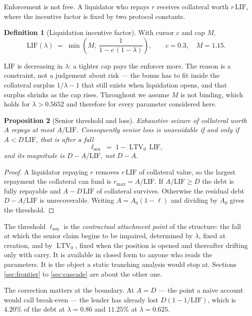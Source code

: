 \documentclass[11pt,a4paper]{article}
\theoremstyle{plain}
\newtheorem{proposition}{Proposition}
\theoremstyle{definition}
\newtheorem{definition}[proposition]{Definition}
\theoremstyle{remark}
\newcommand{\LIF}{\mathrm{LIF}}
\DeclareMathOperator{\ltv}{LTV}
\begin{document}
Enforcement is not free. A liquidator who repays $r$ receives collateral worth $r\,\LIF$, where
the incentive factor is fixed by two protocol constants.

\begin{definition}[Liquidation incentive factor]
With cursor $c$ and cap $M$,
\[
  \LIF(\lambda) \;=\; \min\!\left(M,\ \frac{1}{1-c\,(1-\lambda)}\right),
  \qquad c=0.3,\quad M=1.15 .
\]
\end{definition}

$\LIF$ is decreasing in $\lambda$: a tighter cap pays the enforcer more. The reason is a
constraint, not a judgement about risk --- the bonus has to fit inside the collateral surplus
$1/\lambda-1$ that still exists when liquidation opens, and that surplus shrinks as the cap rises.
Throughout we assume $M$ is not binding, which holds for $\lambda > 0.5652$ and therefore for every
parameter considered here.

\begin{proposition}[Senior threshold and loss]\label{prop:sen}
Exhaustive seizure of collateral worth $A$ repays at most $A/\LIF$. Consequently senior loss is
unavoidable if and only if $A < D\,\LIF$, that is after a fall
\[
  \ell_{\mathrm{sen}} \;=\; 1-\ltv_0\,\LIF ,
\]
and its magnitude is $D - A/\LIF$, not $D-A$.
\end{proposition}

\begin{proof}
A liquidator repaying $r$ removes $r\,\LIF$ of collateral value, so the largest repayment the
collateral can fund is $r_{\max}=A/\LIF$. If $A/\LIF \geq D$ the debt is fully repayable and
$A - D\,\LIF$ of collateral survives. Otherwise the residual debt $D-A/\LIF$ is unrecoverable.
Writing $A = A_0(1-\ell)$ and dividing by $A_0$ gives the threshold.
\end{proof}

The threshold $\ell_{\mathrm{sen}}$ is the \emph{contractual attachment point} of the structure: the
fall at which the senior claim begins to be impaired, determined by $\lambda$, fixed at creation,
and by $\ltv_0$, fixed when the position is opened and thereafter drifting only with carry. It is
available in closed form to anyone who reads the parameters. It is the object a
static tranching analysis would stop at. Sections \ref{sec:frontier} to \ref{sec:cascade} are
about the other one.

The correction matters at the boundary. At $A=D$ --- the point a naive account would call
break-even --- the lender has already lost $D(1-1/\LIF)$, which is $4.20\%$ of the debt at
$\lambda=0.86$ and $11.25\%$ at $\lambda=0.625$.
\end{document}
